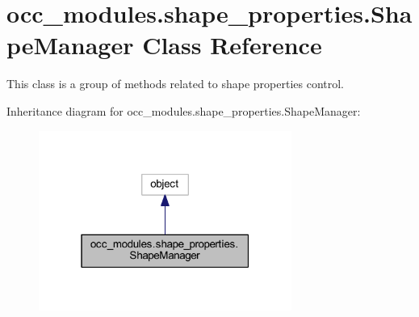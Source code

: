 \hypertarget{classocc__modules_1_1shape__properties_1_1_shape_manager}{}\section{occ\+\_\+modules.\+shape\+\_\+properties.\+Shape\+Manager Class Reference}
\label{classocc__modules_1_1shape__properties_1_1_shape_manager}


This class is a group of methods related to shape properties control.  




Inheritance diagram for occ\+\_\+modules.\+shape\+\_\+properties.\+Shape\+Manager\+:\nopagebreak
\begin{figure}[H]
\begin{center}
\leavevmode
\includegraphics[width=235pt]{classocc__modules_1_1shape__properties_1_1_shape_manager__inherit__graph}
\end{center}
\end{figure}
